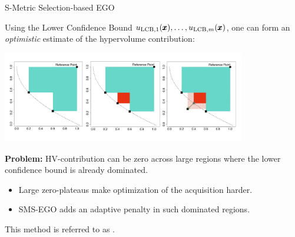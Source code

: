 \documentclass[11pt,compress,t,notes=noshow,xcolor=table]{beamer}
\begin{document}
\begin{vbframe}{S-Metric Selection-based EGO}

Using the Lower Confidence Bound $u_{\text{LCB},1}(\pmb{x}),\dots,u_{\text{LCB},m}(\pmb{x})$,
one can form an \emph{optimistic} estimate of the hypervolume contribution:

\begin{center}
\includegraphics[width=0.8\textwidth]{slides/11-multicrit/figure_man/hv_contribution_2.pdf}
\end{center}

\textbf{Problem:} HV-contribution can be zero across large regions where the lower confidence bound is already dominated.
\begin{itemize}
  \item Large zero-plateaus make optimization of the acquisition harder.
  \item SMS-EGO adds an adaptive penalty in such dominated regions.
\end{itemize}

\medskip

This method is referred to as
.

\end{vbframe}
\end{document}

